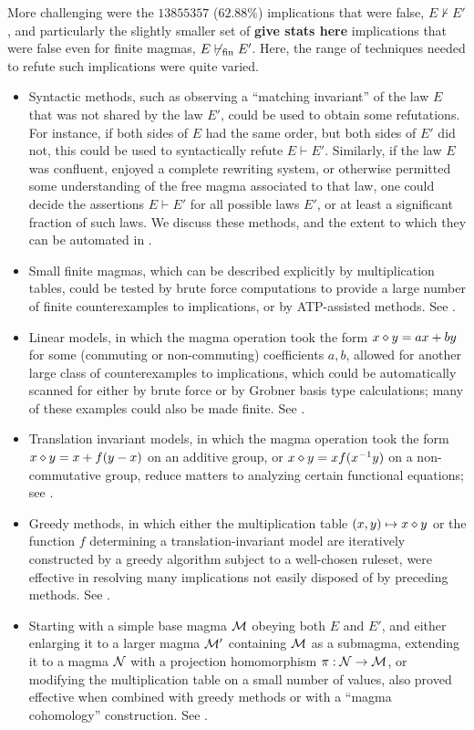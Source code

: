More challenging were the $13855357$ ($62.88\%$) implications that were false, $E \not \vdash E'$, and particularly the slightly smaller set of {\bf give stats here} implications that were false even for finite magmas, $E \not \vdash_{\mathrm{fin}} E'$. Here, the range of techniques needed to refute such implications were quite varied.
\begin{itemize}
        \item Syntactic methods, such as observing a ``matching invariant'' of the law $E$ that was not shared by the law $E'$, could be used to obtain some refutations.  For instance, if both sides of $E$ had the same order, but both sides of $E'$ did not, this could be used to syntactically refute $E \vdash E'$.  Similarly, if the law $E$ was confluent, enjoyed a complete rewriting system, or otherwise permitted some understanding of the free magma associated to that law, one could decide the assertions $E \vdash E'$ for all possible laws $E'$, or at least a significant fraction of such laws.  We discuss these methods, and the extent to which they can be automated in .
        \item Small finite magmas, which can be described explicitly by multiplication tables, could be tested by brute force computations to provide a large number of finite counterexamples to implications, or by ATP-assisted methods. See .
        \item Linear models, in which the magma operation took the form $x \diamond y = ax + by$ for some (commuting or non-commuting) coefficients $a,b$, allowed for another large class of counterexamples to implications, which could be automatically scanned for either by brute force or by Grobner basis type calculations; many of these examples could also be made finite. See .
        \item Translation invariant models, in which the magma operation took the form $x \diamond y = x + f(y-x)$ on an additive group, or $x \diamond y = x f(x^{-1} y)$ on a non-commutative group, reduce matters to analyzing certain functional equations; see .
        \item Greedy methods, in which either the multiplication table $(x,y) \mapsto x \diamond y$ or the function $f$ determining a translation-invariant model are iteratively constructed by a greedy algorithm subject to a well-chosen ruleset, were effective in resolving many implications not easily disposed of by preceding methods. See .
        \item Starting with a simple base magma ${\mathcal{M}}$ obeying both $E$ and $E'$, and either enlarging it to a larger magma ${\mathcal{M}}'$ containing ${\mathcal{M}}$ as a submagma, extending it to a magma ${\mathcal{N}}$ with a projection homomorphism $\pi: {\mathcal{N}} \to {\mathcal{M}}$, or modifying the multiplication table on a small number of values, also proved effective when combined with greedy methods or with a ``magma cohomology'' construction. See .

\end{itemize}
